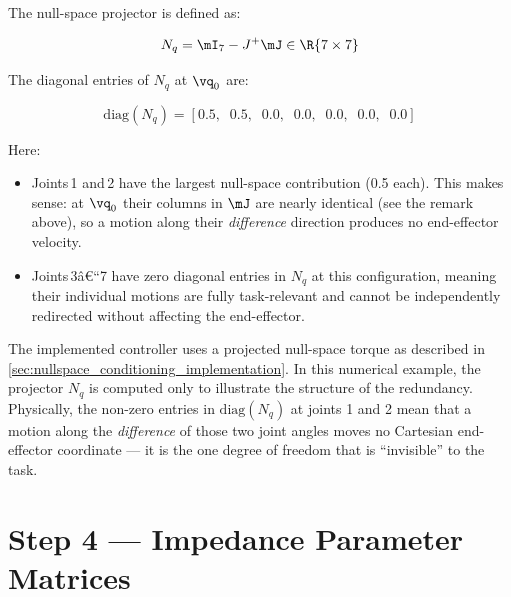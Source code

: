 The null-space projector is defined as:

\begin{equation}
\label{eq:nullspace}
N_q = \mI_7 - J^+\mJ \in \R{7\times7}
\end{equation}

The diagonal entries of $N_q$ at $\vq_0$ are:

\begin{equation}
\mathrm{diag}(N_q) =
[0.5,\;\; 0.5,\;\; 0.0,\;\; 0.0,\;\; 0.0,\;\; 0.0,\;\; 0.0]
\end{equation}

Here:

\begin{itemize}
  \item Joints\,1 and\,2 have the largest null-space contribution (0.5 each).
        This makes sense: at $\vq_0$ their columns in $\mJ$ are nearly
        identical (see the remark above), so a motion along their
        \emph{difference} direction produces no end-effector velocity.
  \item Joints\,3â€“7 have zero diagonal entries in $N_q$ at this
        configuration, meaning their individual motions are fully
        task-relevant and cannot be independently redirected without
        affecting the end-effector.
\end{itemize}

The implemented controller uses a projected null-space torque as described in
\cref{sec:nullspace_conditioning_implementation}. In this numerical example,
the projector $N_q$ is computed only to illustrate the structure of the
redundancy.
Physically, the non-zero entries in $\mathrm{diag}(N_q)$ at joints
1 and 2 mean that a motion along the \emph{difference} of those two joint
angles moves no Cartesian end-effector coordinate --- it is the one degree
of freedom that is ``invisible'' to the task.

\section{Step 4 --- Impedance Parameter Matrices}
\label{app:panda_matrices}

